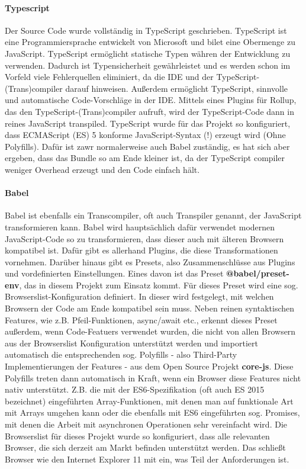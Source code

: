 
\paragraph{Typescript} Der Source Code wurde vollständig in TypeScript geschrieben. TypeScript ist eine Programmiersprache entwickelt von Microsoft und bilet eine Obermenge zu JavaScript. TypeScript ermöglicht statische Typen währen der Entwicklung zu verwenden. Dadurch ist Typensicherheit gewährleistet und es werden schon im Vorfeld viele Fehlerquellen eliminiert, da die IDE und der TypeScript-(Trans)compiler darauf hinweisen. Außerdem ermöglicht TypeScript, sinnvolle und automatische Code-Vorschläge in der IDE. 
Mittels eines Plugins für Rollup, das den TypeScript-(Trans)compiler aufruft, wird der TypeScript-Code dann in reines JavaScript transpiled. TypeScript wurde für das Projekt so konfiguriert, dass ECMAScript (ES) 5 konforme JavaScript-Syntax (!) erzeugt wird (Ohne Polyfills). Dafür ist zawr normalerweise auch Babel zuständig, es hat sich aber ergeben, dass das Bundle so am Ende kleiner ist, da der TypeScript compiler weniger Overhead erzeugt und den Code einfach hält.

\paragraph{Babel} Babel ist ebenfalls ein Transcompiler, oft auch Transpiler genannt, der JavaScript transformieren kann. Babel wird hauptsächlich dafür verwendet modernen JavaScript-Code so zu transformieren, dass dieser auch mit älteren Browsern kompatibel ist. Dafür gibt es allerhand Plugins, die diese Transformationen vornehmen. Darüber hinaus gibt es Presets, also Zusammenschlüsse aus Plugins und vordefinierten Einstellungen. Eines davon ist das Preset \textbf{@babel/preset-env}, das in diesem Projekt zum Einsatz kommt. Für dieses Preset wird eine sog. Browserslist-Konfiguration definiert. In dieser wird festgelegt, mit welchen Browsern der Code am Ende kompatibel sein muss. Neben reinen syntaktischen Features, wie z.B. Pfeil-Funktionen, async/await etc., erkennt dieses Preset außerdem, wenn Code-Featuers verwendet wurden, die nicht von allen Browsern aus der Browserslist Konfiguration unterstützt werden und importiert automatisch die entsprechenden sog. Polyfills - also Third-Party Implementierungen der Features - aus dem Open Source Projekt \textbf{core-js}. Diese Polyfills treten dann automatisch in Kraft, wenn ein Browser diese Features nicht nativ unterstützt. Z.B. die mit der ES6-Spezifikation (oft auch ES 2015 bezeichnet) eingeführten Array-Funktionen, mit denen man auf funktionale Art mit Arrays umgehen kann oder die ebenfalls mit ES6 eingeführten sog. Promises, mit denen die Arbeit mit asynchronen Operationen sehr vereinfacht wird. Die Browserslist für dieses Projekt wurde so konfiguriert, dass alle relevanten Browser, die sich derzeit am Markt befinden unterstützt werden. Das schließt Browser wie den Internet Explorer 11  mit ein, was Teil der Anforderungen ist. 


